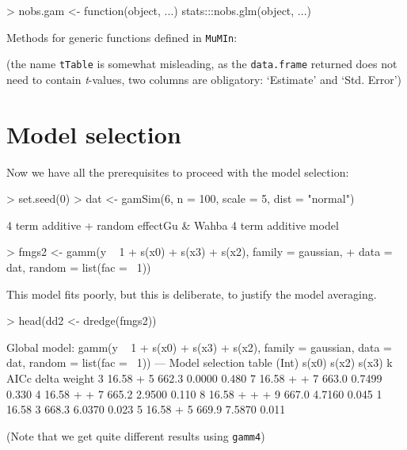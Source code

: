\documentclass{article}
\newcommand{\code}[1]{{\tt #1}}
\newcommand{\pkg}[1]{{\tt #1}}
\newcommand{\sQuote}[1]{{`#1'}}
\begin{document}
\begin{Schunk}
\begin{Sinput}
> nobs.gam <- function(object, ...) stats:::nobs.glm(object, ...)
\end{Sinput}
\end{Schunk}

Methods for generic functions defined in \pkg{MuMIn}:
\begin{Schunk}
\end{Schunk}
(the name \code{tTable} is somewhat misleading, as the \code{data.frame}
returned does not need to contain \emph{t}-values, two columns are obligatory:
\sQuote{Estimate} and \sQuote{Std. Error})

\section{Model selection}

Now we have all the prerequisites to proceed with the model selection:

\begin{Schunk}
\begin{Sinput}
> set.seed(0)
> dat <- gamSim(6, n = 100, scale = 5, dist = "normal")
\end{Sinput}
\begin{Soutput}
4 term additive + random effectGu & Wahba 4 term additive model
\end{Soutput}
\begin{Sinput}
> fmgs2 <- gamm(y ~ 1 + s(x0) + s(x3) + s(x2), family = gaussian, 
+     data = dat, random = list(fac = ~1))
\end{Sinput}
\end{Schunk}
This model fits poorly, but this is deliberate, to justify the model averaging.

\begin{Schunk}
\begin{Sinput}
> head(dd2 <- dredge(fmgs2))
\end{Sinput}
\begin{Soutput}
Global model: gamm(y ~ 1 + s(x0) + s(x3) + s(x2), family = gaussian, data = dat, 
    random = list(fac = ~1))
---
Model selection table 
  (Int) s(x0) s(x2) s(x3) k AICc  delta  weight
3 16.58       +           5 662.3 0.0000 0.480 
7 16.58       +     +     7 663.0 0.7499 0.330 
4 16.58 +     +           7 665.2 2.9500 0.110 
8 16.58 +     +     +     9 667.0 4.7160 0.045 
1 16.58                   3 668.3 6.0370 0.023 
5 16.58             +     5 669.9 7.5870 0.011 
\end{Soutput}
\end{Schunk}
(Note that we get quite different results using \code{gamm4})
\end{document}
